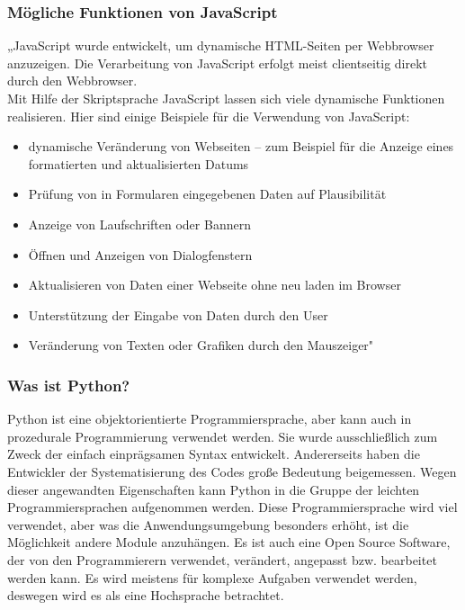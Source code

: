 \subsubsection{Mögliche Funktionen von JavaScript} 
„JavaScript wurde entwickelt, um dynamische HTML-Seiten per Webbrowser anzuzeigen. Die Verarbeitung von JavaScript erfolgt meist clientseitig direkt durch den Webbrowser. \\
Mit Hilfe der Skriptsprache JavaScript lassen sich viele dynamische Funktionen realisieren. Hier sind einige Beispiele für die Verwendung von JavaScript:
\begin{itemize}
	\item  dynamische Veränderung von Webseiten – zum Beispiel für die Anzeige eines formatierten und aktualisierten Datums
\end{itemize}
\begin{itemize}
	\item Prüfung von in Formularen eingegebenen Daten auf Plausibilität
\end{itemize}
\begin{itemize}
	\item Anzeige von Laufschriften oder Bannern
\end{itemize}
\begin{itemize}
	\item 	Öffnen und Anzeigen von Dialogfenstern
\end{itemize}
\begin{itemize}
	\item Aktualisieren von Daten einer Webseite ohne neu laden im Browser
\end{itemize}
\begin{itemize}
	\item 	Unterstützung der Eingabe von Daten durch den User
\end{itemize}
\begin{itemize}
	\item Veränderung von Texten oder Grafiken durch den Mauszeiger"
\end{itemize}
\subsubsection{Was ist Python?} 
Python ist eine objektorientierte Programmiersprache, aber kann auch in prozedurale Programmierung verwendet werden. Sie wurde ausschließlich zum Zweck der einfach einprägsamen Syntax entwickelt. Andererseits haben die Entwickler der Systematisierung des Codes große Bedeutung beigemessen. Wegen dieser angewandten Eigenschaften kann Python in die Gruppe der leichten Programmiersprachen aufgenommen werden. Diese Programmiersprache wird viel verwendet, aber was die Anwendungsumgebung besonders erhöht, ist die Möglichkeit andere Module anzuhängen. Es ist auch eine Open Source Software, der von den Programmierern verwendet, verändert, angepasst bzw. bearbeitet werden kann. Es wird meistens für komplexe Aufgaben verwendet werden, deswegen wird es als eine Hochsprache betrachtet.
